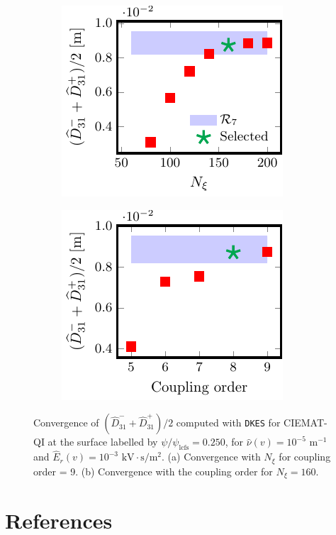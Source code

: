 \documentclass[10pt]{iopart}
\newcommand{\DKES}{{\texttt{DKES}}}
\begin{document}
\begin{figure}[t]
	\centering	
	\begin{subfigure}[t]{0.32\textwidth}
		\includegraphics{DKES-Convergence-Legendre-CIEMAT-QI-s0250-Er-1e-3-D31-Detail}
		\caption{}
		\label{subfig:DKES_D31_convergence_Legendre_CIEMAT_QI_0250_Erho_1e-3_Detail}
	\end{subfigure}
	\begin{subfigure}[t]{0.32\textwidth}
		\includegraphics{DKES-Convergence-theta-zeta-CIEMAT-QI-s0250-Er-1e-3-D31}
		\caption{}
		\label{subfig:DKES_D31_convergence_Coupling_parameter_CIEMAT_QI_0250_Erho_1e-3}
	\end{subfigure}
	
	
	\caption{Convergence of $(\widehat{D}_{31}^- + \widehat{D}_{31}^+) /2$ computed with {\DKES} for CIEMAT-QI at the surface labelled by $\psi/\psi_{\text{lcfs}}=0.250$, for $\hat{\nu}(v)=10^{-5}$ $\text{m}^{-1}$ and $\widehat{E}_r(v)=10^{-3}$ $\text{kV}\cdot\text{s}/\text{m}^2$. (a) Convergence with $N_\xi$ for coupling order = 9. (b) Convergence with the coupling order for $N_\xi= 160$.}
	\label{fig:DKES_Convergence_CIEMAT_QI_Er_1e-3}
\end{figure}
 
	
\FloatBarrier
\section*{References}

{}
\end{document}
